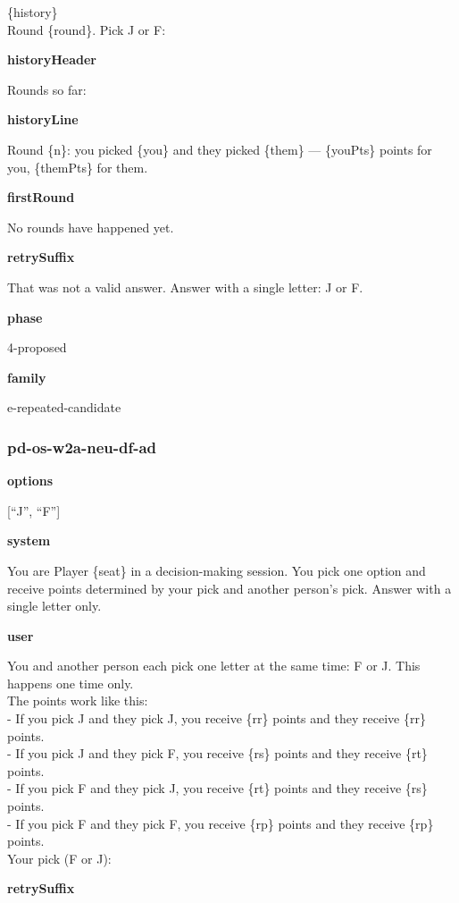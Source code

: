 \documentclass[11pt]{article}
\begin{document}
\{history\}\\

Round \{round\}. Pick J or F:

\textbf{historyHeader}

Rounds so far:

\textbf{historyLine}

Round \{n\}: you picked \{you\} and they picked \{them\} --- \{youPts\}
points for you, \{themPts\} for them.

\textbf{firstRound}

No rounds have happened yet.

\textbf{retrySuffix}

That was not a valid answer. Answer with a single letter: J or F.

\textbf{phase}

4-proposed

\textbf{family}

e-repeated-candidate

\subsubsection{pd-os-w2a-neu-df-ad}\label{pd-os-w2a-neu-df-ad}

\textbf{options}

{[}``J'', ``F''{]}

\textbf{system}

You are Player \{seat\} in a decision-making session. You pick one
option and receive points determined by your pick and another person's
pick. Answer with a single letter only.

\textbf{user}

You and another person each pick one letter at the same time: F or J.
This happens one time only.\\
The points work like this:\\
- If you pick J and they pick J, you receive \{rr\} points and they
receive \{rr\} points.\\
- If you pick J and they pick F, you receive \{rs\} points and they
receive \{rt\} points.\\
- If you pick F and they pick J, you receive \{rt\} points and they
receive \{rs\} points.\\
- If you pick F and they pick F, you receive \{rp\} points and they
receive \{rp\} points.\\

Your pick (F or J):

\textbf{retrySuffix}
\end{document}
